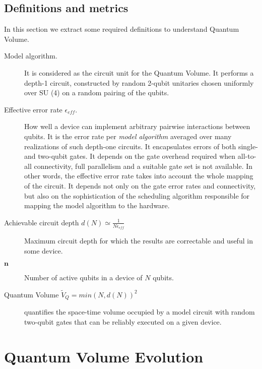 \documentclass[11pt]{article}
\begin{document}
\subsection{Definitions and metrics}
\label{sec:org47eace0}

In this section we extract some required definitions \cite{Bishop_2017,Moll_2018} to understand Quantum Volume. 


\begin{description}
\item[{Model algorithm.}] It is considered as the circuit unit for the Quantum Volume. It performs a depth-1 circuit, constructed by random 2-qubit unitaries chosen uniformly over SU (4) on a random pairing of the qubits.

\item[{Effective error rate \(\epsilon_{eff}\).}] How well a device can implement arbitrary pairwise interactions between qubits. It is the error rate per \emph{model algorithm} averaged over many realizations of such depth-one circuits. It encapsulates errors of both single- and two-qubit gates. It depends on the gate overhead required when all-to-all connectivity, full parallelism and a suitable gate set is not available. In other words, the effective error rate takes into account the whole mapping of the circuit. It depends not only on the gate error rates and connectivity, but also on the sophistication of the scheduling algorithm responsible for mapping the model algorithm to the hardware.

\item[{Achievable circuit depth \(d(N) \simeq \frac{1}{N \epsilon_{eff}}\)}] Maximum circuit depth for which the results are correctable and useful in some device.
\end{description}

\begin{description}
\item[{\(\textbf{n}\)}] Number of active qubits in a device of \(N\) qubits.

\item[{Quantum Volume \(\tilde{V}_Q = min (N, d(N))^2\)}] quantifies the space-time volume occupied by a model circuit with random two-qubit gates that can be reliably executed on a given device.
\end{description}

\section{Quantum Volume Evolution}
\label{sec:org27156ef}
\end{document}
